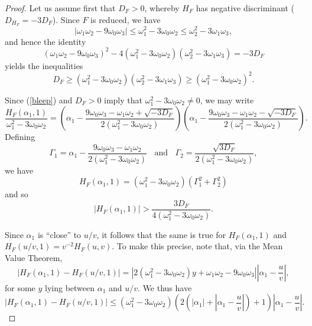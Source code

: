 \begin{proof}
Let us assume first  that $D_F > 0$, whereby $H_F$ has negative discriminant ($D_{H_F}=-3 D_F$).  Since $F$ is reduced, we have
$$
| \omega_1 \omega_2 -9 \omega_0 \omega_3| \leq \omega_1^2-3\omega_0 \omega_2 \leq \omega_2^2 - 3 \omega_1 \omega_3,
$$
and hence the identity
\begin{equation} \label{bleep}
(\omega_1 \omega_2 -9 \omega_0 \omega_3)^2 - 4 (\omega_1^2-3\omega_0 \omega_2) (\omega_2^2 - 3 \omega_1 \omega_3) = - 3 D_F
\end{equation}
yields the inequalities
\begin{equation} \label{bleep2}
D_F \geq  (\omega_1^2-3\omega_0 \omega_2) (\omega_2^2 - 3 \omega_1 \omega_3) \geq (\omega_1^2-3\omega_0 \omega_2)^2.
\end{equation}

Since (\ref{bleep}) and $D_F > 0$ imply that $\omega_1^2-3\omega_0 \omega_2 \neq 0$,
we may write
$$
\frac{H_F (\alpha_1,1)}{ \omega_1^2-3\omega_0 \omega_2} =  \left(\alpha_1 -  \frac{9 \omega_0 \omega_3 - \omega_1 \omega_2 + \sqrt{-3 D_F}}{2 (\omega_1^2-3\omega_0 \omega_2)} \right) \left(\alpha_1 -  \frac{9 \omega_0 \omega_3 - \omega_1 \omega_2 - \sqrt{-3 D_F}}{2 (\omega_1^2-3\omega_0 \omega_2)} \right).
$$
Defining
$$
\Gamma_1 = \alpha_1 -  \frac{9 \omega_0 \omega_3 - \omega_1 \omega_2 }{2 (\omega_1^2-3\omega_0 \omega_2)} \; \; \mbox{ and } \; \; 
\Gamma_2 = \frac{\sqrt{3 D_F}}{2 (\omega_1^2-3\omega_0 \omega_2)},
$$
we have
$$
H_F (\alpha_1,1) = \left( \omega_1^2-3\omega_0 \omega_2 \right) \left( \Gamma_1^2+\Gamma_2^2 \right)
$$
and so
\begin{equation} \label{pos-case}
|H_F(\alpha_1,1)| > \frac{3 D_F}{4 (\omega_1^2-3\omega_0 \omega_2)}.
\end{equation}

Since $\alpha_1$ is ``close'' to $u/v$, it follows that the same is true for $H_F(\alpha_1,1)$ and $H_F(u/v,1) = v^{-2} H_F(u,v)$. To make this precise, note that, 
via the Mean Value Theorem,
\begin{equation} \label{general}
\left| H_F (\alpha_1,1) - H_F (u/v,1) \right| = \left| 2 ( \omega_1^2-3\omega_0 \omega_2) y + \omega_1 \omega_2 -9 \omega_0 \omega_3 \right|
\left| \alpha_1 - \frac{u}{v} \right|,
\end{equation}
for some $y$ lying between $\alpha_1$ and $u/v$. We thus have
\begin{equation} \label{wobbly}
\left| H_F (\alpha_1,1) - H_F (u/v,1) \right| \leq  ( \omega_1^2-3\omega_0 \omega_2) \left( 2 \left( |\alpha_1| + \left| \alpha_1 - \frac{u}{v} \right| \right) +1 \right) \left| \alpha_1 - \frac{u}{v} \right|.
\end{equation}


\end{proof}
